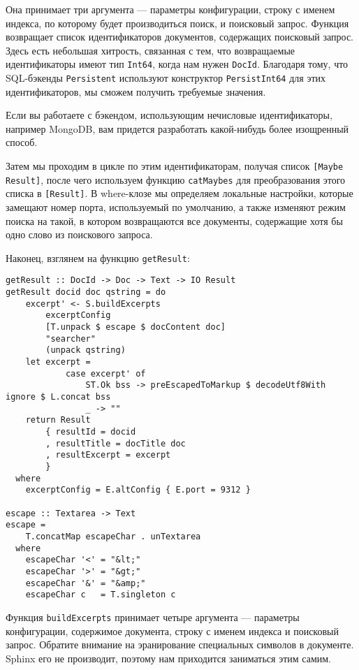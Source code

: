 Она принимает три аргумента --- параметры конфигурации, строку с именем индекса, по которому будет производиться поиск, и поисковый запрос. Функция возвращает список идентификаторов документов, содержащих поисковый запрос. Здесь есть небольшая хитрость, связанная с тем, что возвращаемые идентификаторы имеют тип \lstinline'Int64', когда нам нужен \lstinline'DocId'. Благодаря тому, что SQL-бэкенды \lstinline'Persistent' используют конструктор \lstinline'PersistInt64' для этих идентификаторов, мы сможем получить требуемые значения.

Если вы работаете с бэкендом, использующим нечисловые идентификаторы, например MongoDB, вам придется разработать какой-нибудь более изощренный способ.

Затем мы проходим в цикле по этим идентификаторам, получая список \lstinline'[Maybe Result]', после чего используем функцию \lstinline'catMaybes' для преобразования этого списка в \lstinline'[Result]'. В where-клозе мы определяем локальные настройки, которые замещают номер порта, используемый по умолчанию, а также изменяют режим поиска на такой, в котором возвращаются все документы, содержащие хотя бы одно слово из поискового запроса. %

Наконец, взглянем на функцию \lstinline'getResult':

\begin{lstlisting}
getResult :: DocId -> Doc -> Text -> IO Result
getResult docid doc qstring = do
    excerpt' <- S.buildExcerpts
        excerptConfig
        [T.unpack $ escape $ docContent doc]
        "searcher"
        (unpack qstring)
    let excerpt =
            case excerpt' of
                ST.Ok bss -> preEscapedToMarkup $ decodeUtf8With ignore $ L.concat bss
                _ -> ""
    return Result
        { resultId = docid
        , resultTitle = docTitle doc
        , resultExcerpt = excerpt
        }
  where
    excerptConfig = E.altConfig { E.port = 9312 }

escape :: Textarea -> Text
escape =
    T.concatMap escapeChar . unTextarea
  where
    escapeChar '<' = "&lt;"
    escapeChar '>' = "&gt;"
    escapeChar '&' = "&amp;"
    escapeChar c   = T.singleton c
\end{lstlisting}

Функция \lstinline'buildExcerpts' принимает четыре аргумента --- параметры конфигурации, содержимое документа, строку с именем индекса и поисковый запрос. Обратите внимание на эранирование специальных символов в документе. Sphinx его не производит, поэтому нам приходится заниматься этим самим.


